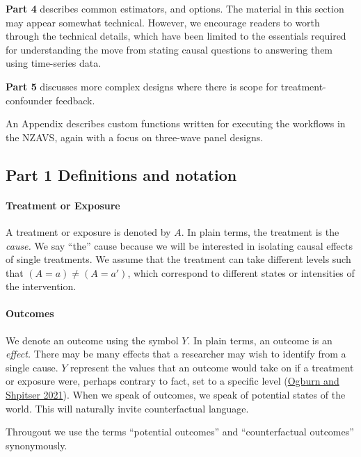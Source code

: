 \documentclass[
  singlecolumn]{article}
\let\oldparagraph\paragraph
\renewcommand{\paragraph}[1]{\oldparagraph{#1}\mbox{}}
\begin{document}
\textbf{Part 4} describes common estimators, and options. The material
in this section may appear somewhat technical. However, we encourage
readers to worth through the technical details, which have been limited
to the essentials required for understanding the move from stating
causal questions to answering them using time-series data.

\textbf{Part 5} discusses more complex designs where there is scope for
treatment-confounder feedback.

An Appendix describes custom functions written for executing the
workflows in the NZAVS, again with a focus on three-wave panel designs.

\subsection{\texorpdfstring{\textbf{Part 1} Definitions and
notation}{Part 1 Definitions and notation}}\label{part-1-definitions-and-notation}

\paragraph{\texorpdfstring{\textbf{Treatment or
Exposure}}{Treatment or Exposure}}\label{treatment-or-exposure}

A treatment or exposure is denoted by \(A\). In plain terms, the
treatment is the \emph{cause.} We say ``the'' cause because we will be
interested in isolating causal effects of single treatments. We assume
that the treatment can take different levels such that
\((A = a) \neq (A = a')\), which correspond to different states or
intensities of the intervention.

\paragraph{\texorpdfstring{\textbf{Outcomes}}{Outcomes}}\label{outcomes}

We denote an outcome using the symbol \(Y\). In plain terms, an outcome
is an \emph{effect.} There may be many effects that a researcher may
wish to identify from a single cause. \(Y\) represent the values that an
outcome would take on if a treatment or exposure were, perhaps contrary
to fact, set to a specific level (\hyperref[ref-ogburn2021]{Ogburn and
Shpitser 2021}). When we speak of outcomes, we speak of potential states
of the world. This will naturally invite counterfactual language.

Througout we use the terms ``potential outcomes'' and ``counterfactual
outcomes'' synonymously.
\end{document}
